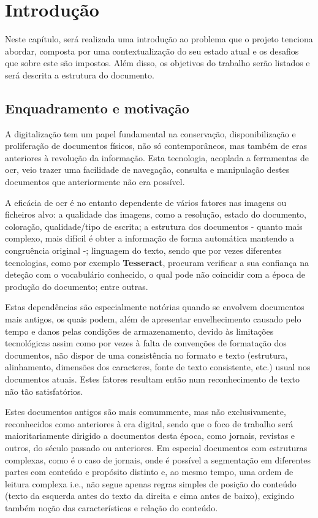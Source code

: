 \chapter{Introdução}
\label{cap_introducao}

Neste capítulo, será realizada uma introdução ao problema que o projeto tenciona abordar, composta por uma contextualização do seu estado atual e os desafios que sobre este são impostos. Além disso, os objetivos do trabalho serão listados e será descrita a estrutura do documento.

\section{Enquadramento e motivação}


A digitalização tem um papel fundamental na conservação, disponibilização e proliferação de documentos físicos, não só contemporâneos, mas também de eras anteriores à revolução da informação. Esta tecnologia, acoplada a ferramentas de \acrshort{ocr}, veio trazer uma facilidade de navegação, consulta e manipulação destes documentos que anteriormente não era possível.

A eficácia de \acrshort{ocr} é no entanto dependente de vários fatores nas imagens ou ficheiros alvo: a qualidade das imagens, como a resolução, estado do documento, coloração, qualidade/tipo de escrita; a estrutura dos documentos - quanto mais complexo, mais difícil é obter a informação de forma automática mantendo 
 a congruência original -; linguagem do texto, sendo que por vezes diferentes tecnologias, como por exemplo \textbf{Tesseract}, procuram verificar a sua confiança na deteção com o vocabulário conhecido, o qual pode não coincidir com a época de produção do documento; entre outras. 

Estas dependências são especialmente notórias quando se envolvem documentos mais antigos, os quais podem, além de apresentar envelhecimento causado pelo tempo e danos pelas condições de armazenamento, devido às limitações tecnológicas assim como por vezes à falta de convenções de formatação dos documentos, não dispor de uma consistência no formato e texto (estrutura, alinhamento, dimensões dos caracteres, fonte de texto consistente, etc.) usual nos documentos atuais. Estes fatores resultam então num reconhecimento de texto não tão satisfatórios. 

Estes documentos antigos são mais comummente, mas não exclusivamente, reconhecidos como anteriores à era digital, sendo que o foco de trabalho será maioritariamente dirigido a documentos desta época, como jornais, revistas e outros, do século passado ou anteriores. 
Em especial documentos com estruturas complexas, como é o caso de jornais, onde é possível a segmentação em diferentes partes com conteúdo e propósito distinto e, ao mesmo tempo, uma ordem de leitura complexa i.e., não segue apenas regras simples de posição do conteúdo (texto da esquerda antes do texto da direita e cima antes de baixo), exigindo também noção das características e relação do conteúdo. 

